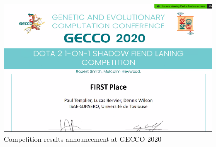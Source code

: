 \begin{figure}[H]
\centering
\includegraphics[width=12cm]{images/breezy-win.png}
\caption{Competition results announcement at GECCO 2020}
\end{figure}

